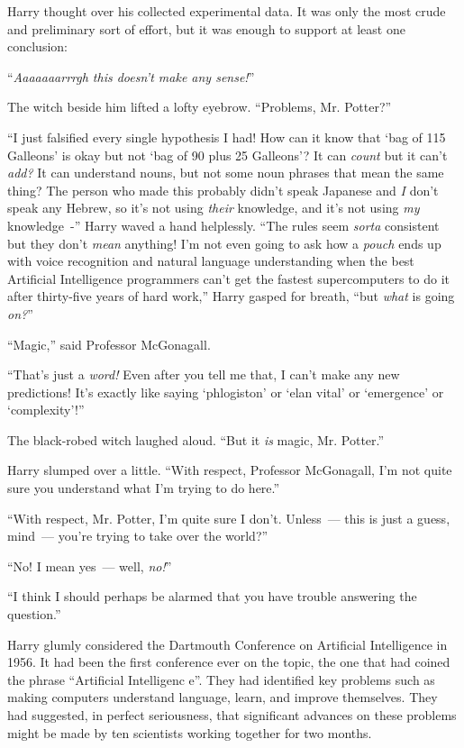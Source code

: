 Harry thought over his collected experimental data. It was only the most crude and preliminary sort of effort, but it was enough to support at least one conclusion:

``\emph{Aaaaaaarrrgh this doesn't make any sense!}''

The witch beside him lifted a lofty eyebrow. ``Problems, Mr. Potter?''

``I just falsified every single hypothesis I had! How can it know that `bag of 115 Galleons' is okay but not `bag of 90 plus 25 Galleons'? It can \emph{count} but it can't \emph{add?} It can understand nouns, but not some noun phrases that mean the same thing? The person who made this probably didn't speak Japanese and \emph{I} don't speak any Hebrew, so it's not using \emph{their} knowledge, and it's not using \emph{my} knowledge~-'' Harry waved a hand helplessly. ``The rules seem \emph{sorta} consistent but they don't \emph{mean} anything! I'm not even going to ask how a \emph{pouch} ends up with voice recognition and natural language understanding when the best Artificial Intelligence programmers can't get the fastest supercomputers to do it after thirty-five years of hard work,'' Harry gasped for breath, ``but \emph{what} is going \emph{on?}''

``Magic,'' said Professor McGonagall.

``That's just a \emph{word!} Even after you tell me that, I can't make any new predictions! It's exactly like saying `phlogiston' or `elan vital' or `emergence' or `complexity'!''

The black-robed witch laughed aloud. ``But it \emph{is} magic, Mr. Potter.''

Harry slumped over a little. ``With respect, Professor McGonagall, I'm not quite sure you understand what I'm trying to do here.''

``With respect, Mr. Potter, I'm quite sure I don't. Unless~--- this is just a guess, mind~--- you're trying to take over the world?''

``No! I mean yes~--- well, \emph{no!}''

``I think I should perhaps be alarmed that you have trouble answering the question.''

Harry glumly considered the Dartmouth Conference on Artificial Intelligence in 1956. It had been the first conference ever on the topic, the one that had coined the phrase ``Artificial Intelligenc e''. They had identified key problems such as making computers understand language, learn, and improve themselves. They had suggested, in perfect seriousness, that significant advances on these problems might be made by ten scientists working together for two months.

